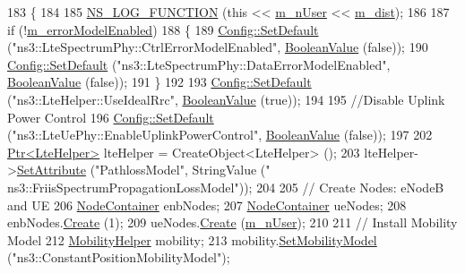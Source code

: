 \begin{DoxyCode}
183 \{
184 
185   \hyperlink{log-macros-disabled_8h_a90b90d5bad1f39cb1b64923ea94c0761}{NS\_LOG\_FUNCTION} (\textcolor{keyword}{this} << \hyperlink{classLenaFdMtFfMacSchedulerTestCase_ad37e35252bb964ef3416fc10774ed9d1}{m\_nUser} << \hyperlink{classLenaFdMtFfMacSchedulerTestCase_a10d998134a542e3dc4a5d22f80a786b2}{m\_dist});
186 
187   \textcolor{keywordflow}{if} (!\hyperlink{classLenaFdMtFfMacSchedulerTestCase_ae414c4b16c3f30541fe039107be35095}{m\_errorModelEnabled})
188     \{
189       \hyperlink{group__config_ga2e7882df849d8ba4aaad31c934c40c06}{Config::SetDefault} (\textcolor{stringliteral}{"ns3::LteSpectrumPhy::CtrlErrorModelEnabled"}, 
      \hyperlink{classns3_1_1BooleanValue}{BooleanValue} (\textcolor{keyword}{false}));
190       \hyperlink{group__config_ga2e7882df849d8ba4aaad31c934c40c06}{Config::SetDefault} (\textcolor{stringliteral}{"ns3::LteSpectrumPhy::DataErrorModelEnabled"}, 
      \hyperlink{classns3_1_1BooleanValue}{BooleanValue} (\textcolor{keyword}{false}));
191     \}
192 
193   \hyperlink{group__config_ga2e7882df849d8ba4aaad31c934c40c06}{Config::SetDefault} (\textcolor{stringliteral}{"ns3::LteHelper::UseIdealRrc"}, 
      \hyperlink{classns3_1_1BooleanValue}{BooleanValue} (\textcolor{keyword}{true}));
194 
195   \textcolor{comment}{//Disable Uplink Power Control}
196   \hyperlink{group__config_ga2e7882df849d8ba4aaad31c934c40c06}{Config::SetDefault} (\textcolor{stringliteral}{"ns3::LteUePhy::EnableUplinkPowerControl"}, 
      \hyperlink{classns3_1_1BooleanValue}{BooleanValue} (\textcolor{keyword}{false}));
197 
202   \hyperlink{classns3_1_1Ptr}{Ptr<LteHelper>} lteHelper = CreateObject<LteHelper> ();
203   lteHelper->\hyperlink{classns3_1_1ObjectBase_ac60245d3ea4123bbc9b1d391f1f6592f}{SetAttribute} (\textcolor{stringliteral}{"PathlossModel"}, StringValue (\textcolor{stringliteral}{"
      ns3::FriisSpectrumPropagationLossModel"}));
204 
205   \textcolor{comment}{// Create Nodes: eNodeB and UE}
206   \hyperlink{classns3_1_1NodeContainer}{NodeContainer} enbNodes;
207   \hyperlink{classns3_1_1NodeContainer}{NodeContainer} ueNodes;
208   enbNodes.\hyperlink{classns3_1_1NodeContainer_a787f059e2813e8b951cc6914d11dfe69}{Create} (1);
209   ueNodes.\hyperlink{classns3_1_1NodeContainer_a787f059e2813e8b951cc6914d11dfe69}{Create} (\hyperlink{classLenaFdMtFfMacSchedulerTestCase_ad37e35252bb964ef3416fc10774ed9d1}{m\_nUser});
210 
211   \textcolor{comment}{// Install Mobility Model}
212   \hyperlink{classns3_1_1MobilityHelper}{MobilityHelper} mobility;
213   mobility.\hyperlink{classns3_1_1MobilityHelper_a030275011b6f40682e70534d30280aba}{SetMobilityModel} (\textcolor{stringliteral}{"ns3::ConstantPositionMobilityModel"});

\end{DoxyCode}
